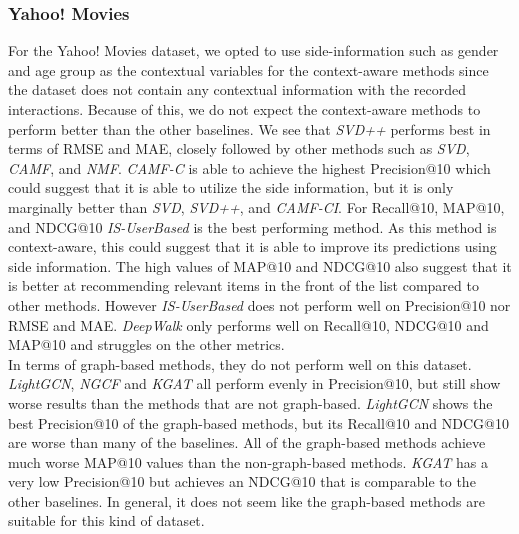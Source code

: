 \subsubsection{Yahoo! Movies}
For the Yahoo! Movies dataset, we opted to use side-information such as gender and age group as the contextual variables for the context-aware methods since the dataset does not contain any contextual information with the recorded interactions.
Because of this, we do not expect the context-aware methods to perform better than the other baselines.
We see that \textit{SVD++} performs best in terms of RMSE and MAE, closely followed by other methods such as \textit{SVD}, \textit{CAMF}, and \textit{NMF}.
\textit{CAMF-C} is able to achieve the highest Precision@10 which could suggest that it is able to utilize the side information, but it is only marginally better than \textit{SVD}, \textit{SVD++}, and \textit{CAMF-CI}.
For Recall@10, MAP@10, and NDCG@10 \textit{IS-UserBased} is the best performing method.
As this method is context-aware, this could suggest that it is able to improve its predictions using side information.
The high values of MAP@10 and NDCG@10 also suggest that it is better at recommending relevant items in the front of the list compared to other methods.
However \textit{IS-UserBased} does not perform well on Precision@10 nor RMSE and MAE.
\textit{DeepWalk} only performs well on Recall@10, NDCG@10 and MAP@10 and struggles on the other metrics.
\\
In terms of graph-based methods, they do not perform well on this dataset.
\textit{LightGCN}, \textit{NGCF} and \textit{KGAT} all perform evenly in Precision@10, but still show worse results than the methods that are not graph-based.
\textit{LightGCN} shows the best Precision@10 of the graph-based methods, but its Recall@10 and NDCG@10 are worse than many of the baselines.
All of the graph-based methods achieve much worse MAP@10 values than the non-graph-based methods.
\textit{KGAT} has a very low Precision@10 but achieves an NDCG@10 that is comparable to the other baselines.
In general, it does not seem like the graph-based methods are suitable for this kind of dataset.

